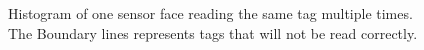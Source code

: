 \begin{figure}[h]
	
	\caption{Histogram of one sensor face reading the same tag multiple times. The Boundary lines represents tags that will not be read correctly.}
	\label{fig:histogram}
\end{figure}


%	
